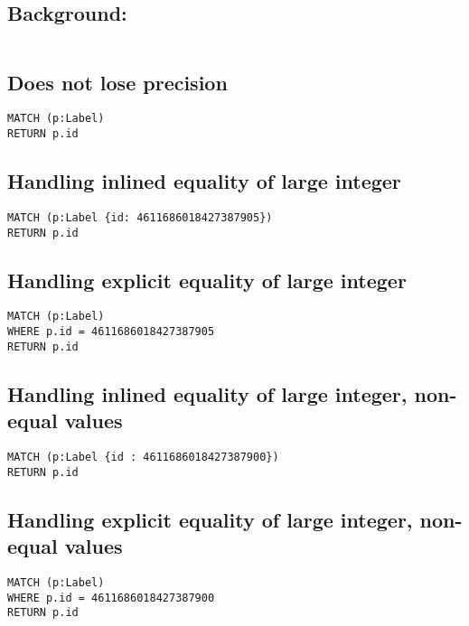 \subsection{Background:}

\begin{lstlisting}
\end{lstlisting}

\subsection{Does not lose precision}

\begin{lstlisting}
MATCH (p:Label)
RETURN p.id
\end{lstlisting}

\subsection{Handling inlined equality of large integer}

\begin{lstlisting}
MATCH (p:Label {id: 4611686018427387905})
RETURN p.id
\end{lstlisting}

\subsection{Handling explicit equality of large integer}

\begin{lstlisting}
MATCH (p:Label)
WHERE p.id = 4611686018427387905
RETURN p.id
\end{lstlisting}

\subsection{Handling inlined equality of large integer, non-equal values}

\begin{lstlisting}
MATCH (p:Label {id : 4611686018427387900})
RETURN p.id
\end{lstlisting}

\subsection{Handling explicit equality of large integer, non-equal values}

\begin{lstlisting}
MATCH (p:Label)
WHERE p.id = 4611686018427387900
RETURN p.id
\end{lstlisting}

